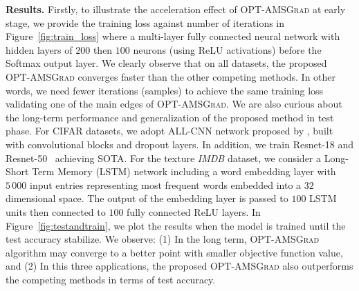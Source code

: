 \documentclass[11pt]{article}
\theoremstyle{k}
\begin{document}
\textbf{Results.}
Firstly, to illustrate the acceleration effect of \textsc{OPT-AMSGrad} at early stage, we provide the training loss against number of iterations in Figure~\ref{fig:train_loss} where a multi-layer fully connected neural network with hidden layers of $200$ then $100$ neurons (using \textrm{ReLU} activations) before the \textrm{Softmax} output layer. 
We clearly observe that on all datasets, the proposed \textsc{OPT-AMSGrad} converges faster than the other competing methods. 
In other words, we need fewer iterations (samples) to achieve the same training loss validating one of the main edges of \textsc{OPT-AMSGrad}.
We are also curious about the long-term performance and generalization of the proposed method in test phase.
For CIFAR datasets, we adopt ALL-CNN network proposed by \citep{CNN15}, built with convolutional blocks and dropout layers.
In addition, we train Resnet-18 and Resnet-50~\citep{Rnet16} achieving SOTA. 
For the texture \textit{IMDB} dataset, we consider a Long-Short Term Memory (LSTM) network \citep{gers1999learning} including a word embedding layer with $5\,000$ input entries representing most frequent words embedded into a $32$ dimensional space. 
The output of the embedding layer is passed to $100$ LSTM units then connected to $100$ fully connected \textrm{ReLU} layers. 
In Figure~\ref{fig:testandtrain}, we plot the results when the model is trained until the test accuracy stabilize. 
We observe: \textsf{(1)} In the long term, \textsc{OPT-AMSGrad} algorithm may converge to a better point with smaller objective function value, and \textsf{(2)} In this three applications, the proposed \textsc{OPT-AMSGrad} also outperforms the competing methods in terms of test accuracy. 
\vspace{-0.4cm}
\end{document}
